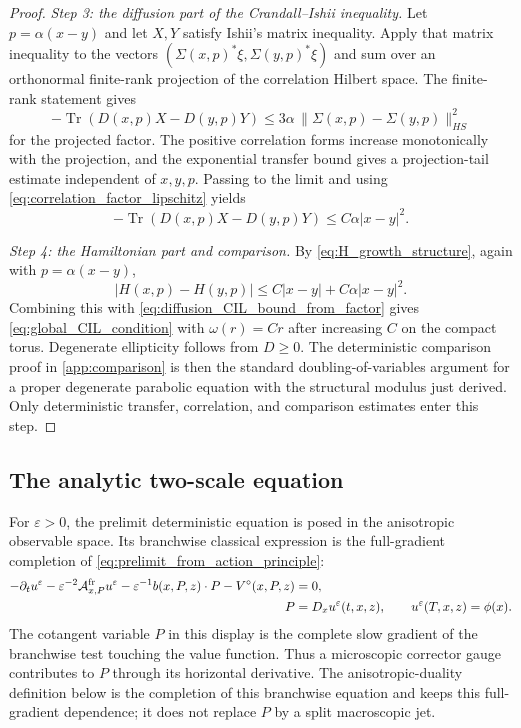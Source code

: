 \documentclass[12pt, letterpaper]{amsart}
\newcommand{\Acal}{\mathcal{A}}
\providecommand{\Tr}{\operatorname{Tr}}
\theoremstyle{plain}
\theoremstyle{definition}
\theoremstyle{remark}
\begin{document}
\begin{proof}
\emph{Step 3: the diffusion part of the Crandall--Ishii inequality.}
Let $p=\alpha(x-y)$ and let $X,Y$ satisfy Ishii's matrix inequality.  Apply that
matrix inequality to the vectors
$(\Sigma(x,p)^*\xi,\Sigma(y,p)^*\xi)$ and sum over an orthonormal finite-rank
projection of the correlation Hilbert space.  The finite-rank statement gives
\begin{equation}
    -\Tr(D(x,p)X-D(y,p)Y)
    \le 3\alpha\,\|\Sigma(x,p)-\Sigma(y,p)\|_{HS}^2
\end{equation}
for the projected factor.  The positive correlation forms increase monotonically
with the projection, and the exponential transfer bound gives a projection-tail
estimate independent of $x,y,p$.  Passing to the limit and using
\eqref{eq:correlation_factor_lipschitz} yields
\begin{equation}
\label{eq:diffusion_CIL_bound_from_factor}
    -\Tr(D(x,p)X-D(y,p)Y)
    \le C\alpha|x-y|^2 .
\end{equation}

\emph{Step 4: the Hamiltonian part and comparison.}
By \eqref{eq:H_growth_structure}, again with $p=\alpha(x-y)$,
\begin{equation}
    |H(x,p)-H(y,p)|
    \le C|x-y|+C\alpha|x-y|^2 .
\end{equation}
Combining this with \eqref{eq:diffusion_CIL_bound_from_factor} gives
\eqref{eq:global_CIL_condition} with
$\omega(r)=Cr$ after increasing $C$ on the compact torus.  Degenerate ellipticity
follows from $D\ge0$.  The deterministic comparison proof in
\cref{app:comparison} is then the standard doubling-of-variables argument for a
proper degenerate parabolic equation with the structural modulus just derived.
Only deterministic transfer, correlation, and comparison estimates enter this step.
\end{proof}


\subsection{The analytic two-scale equation}

For $\varepsilon>0$, the prelimit deterministic equation is posed in the
anisotropic observable space.  Its branchwise classical expression is the
full-gradient completion of \eqref{eq:prelimit_from_action_principle}:
\begin{align}
\label{eq:prelimit_deterministic_hjb}
    -\partial_t u^\varepsilon
    -\varepsilon^{-2}\Acal^{\rm fr}_{x,P}u^\varepsilon
    -\varepsilon^{-1}b(x,P,z)\cdot P
    -V^\circ(x,P,z)&=0,\\
    P&=D_xu^\varepsilon(t,x,z),
    \qquad u^\varepsilon(T,x,z)=\phi(x).
\end{align}
The cotangent variable $P$ in this display is the complete slow gradient of the
branchwise test touching the value function.  Thus a microscopic corrector gauge
contributes to $P$ through its horizontal derivative.  The anisotropic-duality
definition below is the completion of this branchwise equation and keeps this
full-gradient dependence; it does not replace $P$ by a split macroscopic jet.
\end{document}
